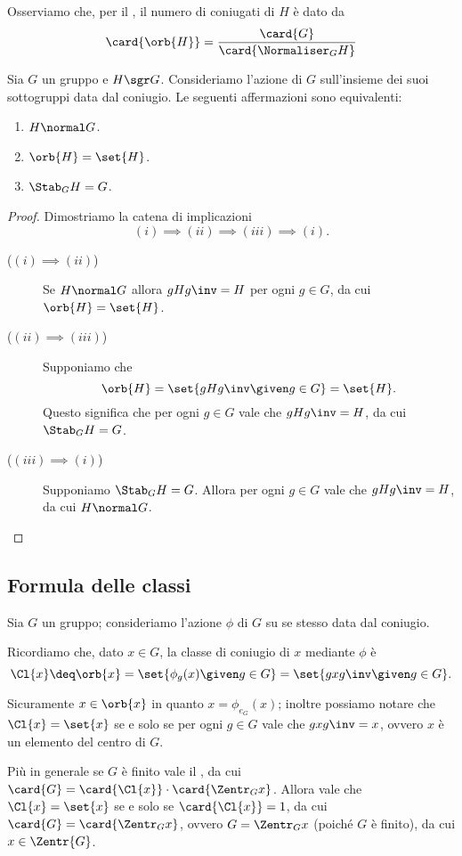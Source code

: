 Osserviamo che, per il , il numero di coniugati di $H$ è dato da \[
    \card{\orb{H}} = \frac{\card{G}}{\card{\Normaliser_{G}{H}}}    
\]
\begin{proposition}
    Sia $G$ un gruppo e $H \sgr G$. 
    Consideriamo l'azione di $G$ sull'insieme dei suoi sottogruppi data dal coniugio.
    Le seguenti affermazioni sono equivalenti:
    \begin{enumerate}[label={(\roman*)}]
        \item $H \normal G$.
        \item $\orb{H} = \set{H}$.
        \item $\Stab_{G}{H} = G$.
    \end{enumerate}
\end{proposition}
\begin{proof}
    Dimostriamo la catena di implicazioni \[
        (i) \implies (ii) \implies (iii) \implies (i).    
    \]
    \begin{description}
        \item[($(i) \implies (ii)$)] Se $H \normal G$ allora $gHg\inv = H$ per ogni $g \in G$, da cui $\orb{H} = \set{H}$.
        \item[($(ii) \implies (iii)$)] Supponiamo che \[
            \orb{H} = \set{gHg\inv \given g \in G} = \set{H}.    
        \] Questo significa che per ogni $g \in G$ vale che $gHg\inv = H$, da cui $\Stab_{G}{H} = G$.
        \item[($(iii) \implies (i)$)] Supponiamo $\Stab_{G}{H} = G$. Allora per ogni $g \in G$ vale che $gHg\inv = H$, da cui $H \normal G$.
    \end{description}
\end{proof}

\subsection{Formula delle classi}
Sia $G$ un gruppo; consideriamo l'azione $\phi$ di $G$ su se stesso data dal coniugio.

Ricordiamo che, dato $x \in G$, la classe di coniugio di $x$ mediante $\phi$ è \[
    \Cl{x} \deq \orb{x} = \set{\phi_g(x) \given g \in G} = \set{gxg\inv \given g \in G}.    
\]

Sicuramente $x \in \orb{x}$ in quanto $x = \phi_{e_G}(x)$; inoltre possiamo notare che $\Cl{x} = \set{x}$ se e solo se per ogni $g \in G$ vale che $gxg\inv = x$, ovvero $x$ è un elemento del centro di $G$.

Più in generale se $G$ è finito vale il , da cui $\card{G} = \card{\Cl{x}}\cdot \card{\Zentr_{G}{x}}$. Allora vale che $\Cl{x} = \set{x}$ se e solo se $\card{\Cl{x}} = 1$, da cui $\card{G} = \card{\Zentr_{G}{x}}$, ovvero $G = \Zentr_{G}{x}$ (poiché $G$ è finito), da cui $x \in \Zentr{G}$.

